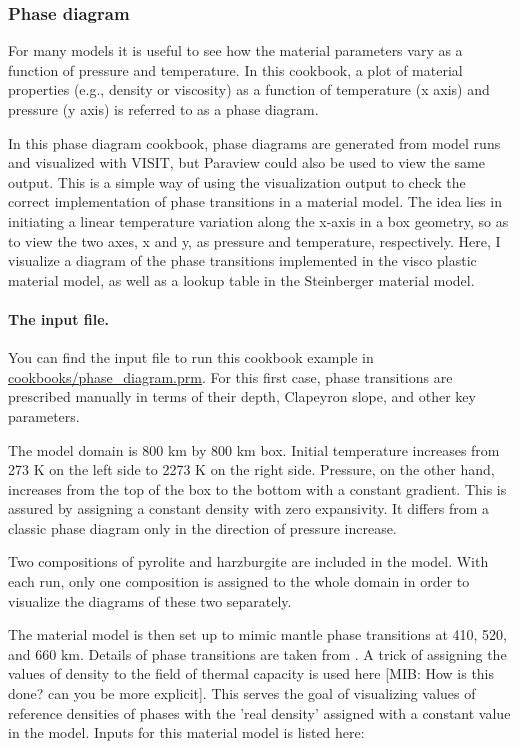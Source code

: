 \subsubsection{Phase diagram}

\label{sec:phase-diagram}
For many models it is useful to see how the material parameters vary as a function of pressure and temperature. In this cookbook, a plot of material properties (e.g., density or viscosity) as a function of temperature (x axis) and pressure (y axis) is referred to as a phase diagram. 

In this phase diagram cookbook, phase diagrams are generated from model runs and visualized with VISIT, but Paraview could also be used to view the same output. %
This is a simple way of using the visualization output to check the correct implementation of phase transitions in a material model. 
The idea lies in initiating a linear temperature variation along the x-axis in a box geometry, so as to view the two axes, x and y,  as pressure and temperature, respectively. %
Here, I visualize a diagram of the phase transitions implemented in the visco plastic material model, as well as a lookup table in the Steinberger material model. 

\paragraph{The input file.}
You can find the input file to run this cookbook example in \url{cookbooks/phase_diagram.prm}. For this first case, phase transitions are prescribed manually in terms of their depth, Clapeyron slope, and other key parameters. 

\par The model domain is  800 km  by 800 km box. %
Initial temperature increases from 273 K on the left side to 2273 K on the right side. %
Pressure, on the other hand, increases from the top of the box to the bottom with a constant gradient.
This is assured by assigning a constant density with zero expansivity.
It differs from a classic phase diagram only in the direction of pressure increase.

\par Two compositions of pyrolite and harzburgite are included in the model. %
With each run, only one composition is assigned to the whole domain in order to visualize the diagrams of these two separately.

\par The material model is then set up to mimic mantle phase transitions at 410, 520, and 660 km.%
Details of phase transitions are taken from \cite{billen2018decoupling}.
A trick of assigning the values of density to the field of thermal capacity is used here [MIB: How is this done? can you be more explicit]. %
This serves the goal of visualizing values of reference densities of phases with the 'real density' assigned with a constant value in the model.
Inputs for this material model is listed here:



